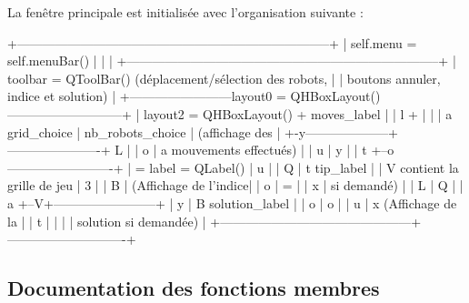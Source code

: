 \begin{DoxyVerb}La fenêtre principale est initialisée avec l'organisation suivante :

+--------------------------------------------------------------------------+
|              self.menu = self.menuBar()                                  |
|                                                                          |
+--------------------------------------------------------------------------+
|       toolbar = QToolBar()  (déplacement/sélection des robots,           |
|                     boutons annuler, indice et solution)                 |
+------------------------layout0 = QHBoxLayout()---------------------------+
|    layout2 = QHBoxLayout()                  +      moves_label           |
| l                    +                      |                            |
| a  grid_choice       |  nb_robots_choice    |     (affichage des         |
+-y--------------------+----------------------+  L                         |
| o                                           |  a  mouvements effectués)  |
| u                                           |  y                         |
| t                                           +--o-------------------------+
| =          label = QLabel()                 |  u                         |
| Q                                           |  t     tip_label           |
| V          contient la grille de jeu        |  3                         |
| B                                           |      (Affichage de l'indice|
| o                                           |  =                         |
| x                                           |      si demandé)           |
| L                                           |  Q                         |
| a                                           +--V+------------------------+
| y                                           |  B     solution_label      |
| o                                           |  o                         |
| u                                           |  x   (Affichage de la      |
| t                                           |                            |
|                                             |      solution si demandée) |
+---------------------------------------------+----------------------------+\end{DoxyVerb}
 

\subsection{Documentation des fonctions membres}
\mbox{\label{classmain_1_1MainWindow_a58e160cf36543e63aa78558a54e9fea1}} 

